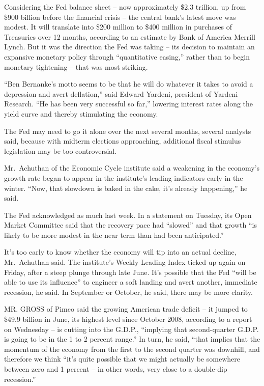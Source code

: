 ﻿\documentclass[12pt]{article}
\begin{document}
Considering the Fed balance sheet -- now approximately \$2.3 trillion, up from \$900 billion before
the financial crisis -- the central bank's latest move was modest. It will translate into \$200
million to \$400 million in purchases of Treasuries over 12 months, according to an estimate by Bank
of America Merrill Lynch. But it was the direction the Fed was taking -- its decision to maintain an
expansive monetary policy through ``quantitative easing,'' rather than to begin monetary tightening
-- that was most striking.

``Ben Bernanke's motto seems to be that he will do whatever it takes to avoid a depression and avert
deflation,'' said Edward Yardeni, president of Yardeni Research. ``He has been very successful so
far,'' lowering interest rates along the yield curve and thereby stimulating the economy.

The Fed may need to go it alone over the next several months, several analysts said, because with
midterm elections approaching, additional fiscal stimulus legislation may be too controversial.

Mr.~Achuthan of the Economic Cycle institute said a weakening in the economy's growth rate began to
appear in the institute's leading indicators early in the winter. ``Now, that slowdown is baked in
the cake, it's already happening,'' he said.

The Fed acknowledged as much last week. In a statement on Tuesday, its Open Market Committee said
that the recovery pace had ``slowed'' and that growth ``is likely to be more modest in the near term
than had been anticipated.''

It's too early to know whether the economy will tip into an actual decline, Mr.~Achuthan said. The
institute's Weekly Leading Index ticked up again on Friday, after a steep plunge through late June.
It's possible that the Fed ``will be able to use its influence'' to engineer a soft landing and
avert another, immediate recession, he said. In September or October, he said, there may be more
clarity.

MR. GROSS of Pimco said the growing American trade deficit -- it jumped to \$49.9 billion in June,
its highest level since October 2008, according to a report on Wednesday -- is cutting into the
G.D.P., ``implying that second-quarter G.D.P. is going to be in the 1 to 2 percent range.'' In turn,
he said, ``that implies that the momentum of the economy from the first to the second quarter was
downhill, and therefore we think ``it's quite possible that we might actually be somewhere between
zero and 1 percent -- in other words, very close to a double-dip recession.''
\end{document}
